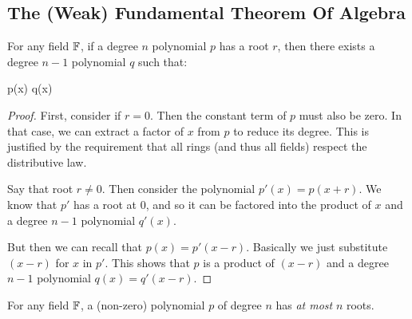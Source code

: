 \subsection{The (Weak) Fundamental Theorem Of Algebra}

\begin{lemma}
  For any field $\mathbb{F}$, if a degree $n$ polynomial $p$ has a root $r$,
  then there exists a degree $n-1$ polynomial $q$ such that:

  \begin{nedqn}
    p(x)
  \eqcol
    q(x)
  \end{nedqn}
\end{lemma}

\begin{proof}
  First, consider if $r = 0$. Then the constant term of $p$ must also be
  zero. In that case, we can extract a factor of $x$ from $p$ to reduce
  its degree. This is justified by the requirement that all rings (and
  thus all fields) respect the distributive law.

  Say that root $r \ne 0$. Then consider the polynomial $p'(x) = p(x +
  r)$. We know that $p'$ has a root at 0, and so it can be factored into
  the product of $x$ and a degree $n-1$ polynomial $q'(x)$.

  But then we can recall that $p(x) = p'(x - r)$. Basically we just
  substitute $(x-r)$ for $x$ in $p'$. This shows that $p$ is a product
  of $(x - r)$ and a degree $n-1$ polynomial $q(x) = q'(x - r)$.
\end{proof}

\begin{lemma}
  For any field $\mathbb{F}$, a (non-zero) polynomial $p$ of degree $n$ has
  \emph{at most} $n$ roots.
\end{lemma}

